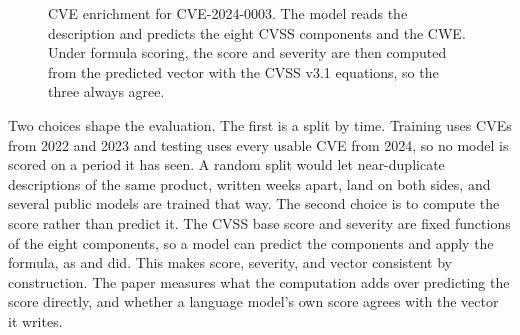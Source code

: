 \begin{figure}[t]
\centering
{}
\caption{CVE enrichment for CVE-2024-0003. The model reads the description and predicts the eight CVSS components and the CWE. Under formula scoring, the score and severity are then computed from the predicted vector with the CVSS v3.1 equations, so the three always agree.}
\label{fig:task}
\end{figure}

Two choices shape the evaluation.
The first is a split by time.
Training uses CVEs from 2022 and 2023 and testing uses every usable CVE from 2024, so no model is scored on a period it has seen.
A random split would let near-duplicate descriptions of the same product, written weeks apart, land on both sides, and several public models are trained that way.
The second choice is to compute the score rather than predict it.
The CVSS base score and severity are fixed functions of the eight components, so a model can predict the components and apply the formula, as \citet{elbaz2020fighting} and \citet{shahid2021cvssbert} did.
This makes score, severity, and vector consistent by construction.
The paper measures what the computation adds over predicting the score directly, and whether a language model's own score agrees with the vector it writes.

